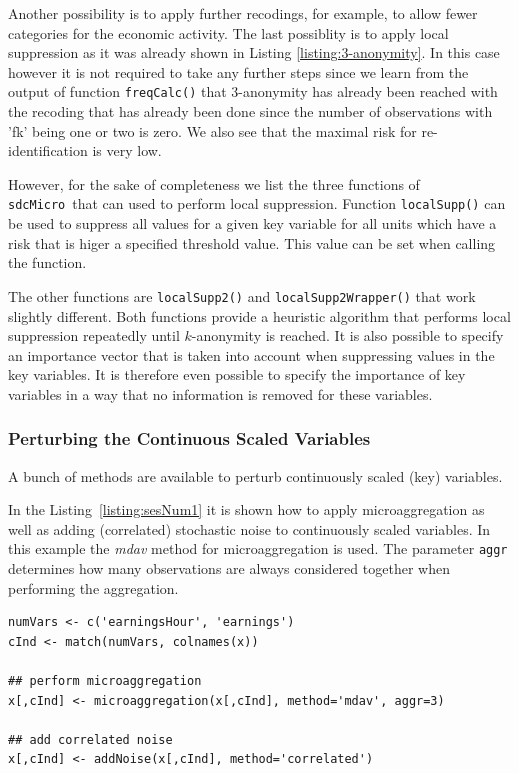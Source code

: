 \documentclass[12pt]{article}
\newcommand{\sdcMicro}{\texttt{sdcMicro}}
\begin{document}
Another possibility is to apply further recodings, for example, to 
allow fewer categories for the economic activity. The last possiblity is to apply local suppression as it was already shown in Listing \ref{listing:3-anonymity}. In this case however it is not required to take any further steps since we learn from the output of function \lstinline{freqCalc()} that 3-anonymity has already been reached with the recoding that has already been done since the number of observations with 'fk' being one or two is zero. We also see that the maximal risk for re-identification is very low.

However, for the sake of completeness we list the three functions of \sdcMicro~that can used to perform local suppression. Function \lstinline{localSupp()} can be used to suppress all values for a given key variable for all units which have a risk that is higer a specified threshold value. This value can be set when calling the function.  

The other functions are \lstinline{localSupp2()} and \lstinline{localSupp2Wrapper()} that work slightly different. Both functions provide a heuristic algorithm that performs local suppression repeatedly until $k$-anonymity is reached. It is also possible to specify an importance vector that is taken into account when suppressing values in the key variables. It is therefore even possible to specify the importance of key variables in a way that no information is removed for these variables.

\subsubsection{Perturbing the Continuous Scaled Variables}

A bunch of methods are available to perturb continuously scaled (key) variables.

In the Listing~\ref{listing:sesNum1} it is shown how to apply microaggregation as well as adding (correlated) stochastic noise to continuously scaled variables. In this example the {\it mdav} method for microaggregation is used. The parameter \texttt{aggr} determines how many observations are always considered together when performing the aggregation. 

\begin{lstlisting}[numbers=none,captionpos=b, caption={Microaggregation and addition of stochastic noise applied to continuous key variables of the SES data.}, label=listing:sesNum1]
numVars <- c('earningsHour', 'earnings')
cInd <- match(numVars, colnames(x))

## perform microaggregation
x[,cInd] <- microaggregation(x[,cInd], method='mdav', aggr=3)

## add correlated noise
x[,cInd] <- addNoise(x[,cInd], method='correlated')
\end{lstlisting}
\end{document}
